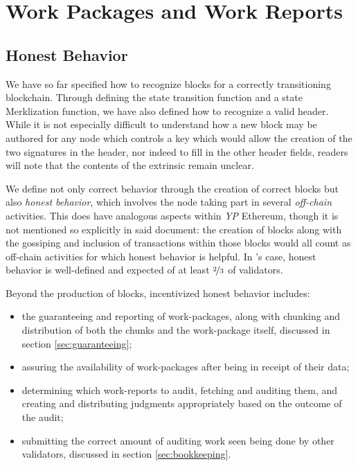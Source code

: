 \section{Work Packages and Work Reports}\label{sec:workpackagesandworkreports}

\newcommand*{\newavailabilityspecifier}{A}
\newcommand*{\itemtoresult}{C}
\newcommand*{\countupexports}{I}
\newcommand*{\importsegmentdata}{S}
\newcommand*{\justifysegmentdata}{J}
\newcommand*{\pagedproofs}{P}
\newcommand*{\marshallrefine}{R}
\newcommand*{\extrinsicdata}{X}
\newcommand*{\wpX}{p}
\newcommand*{\wiX}{w}

\subsection{Honest Behavior}

We have so far specified how to recognize blocks for a correctly transitioning \Jam blockchain. Through defining the state transition function and a state Merklization function, we have also defined how to recognize a valid header. While it is not especially difficult to understand how a new block may be authored for any node which controls a key which would allow the creation of the two signatures in the header, nor indeed to fill in the other header fields, readers will note that the contents of the extrinsic remain unclear.

We define not only correct behavior through the creation of correct blocks but also \emph{honest behavior}, which involves the node taking part in several \emph{off-chain} activities. This does have analogous aspects within \emph{YP} Ethereum, though it is not mentioned so explicitly in said document: the creation of blocks along with the gossiping and inclusion of transactions within those blocks would all count as off-chain activities for which honest behavior is helpful. In \Jam's case, honest behavior is well-defined and expected of at least $\nicefrac{2}{3}$ of validators.

Beyond the production of blocks, incentivized honest behavior includes:
\begin{itemize}
    \item the guaranteeing and reporting of work-packages, along with chunking and distribution of both the chunks and the work-package itself, discussed in section \ref{sec:guaranteeing};
    \item assuring the availability of work-packages after being in receipt of their data;
    \item determining which work-reports to audit, fetching and auditing them, and creating and distributing judgments appropriately based on the outcome of the audit;
    \item submitting the correct amount of auditing work seen being done by other validators, discussed in section \ref{sec:bookkeeping}.
\end{itemize}

